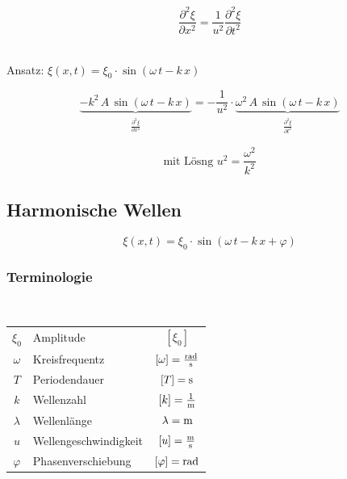 \begin{minipage}{0.38\linewidth}
$$\frac{\partial^2 \xi}{\partial x^2} = \frac{1}{u^2} \frac{\partial^2 \xi}{\partial t^2} $$ \\
\end{minipage}
\hfill
\begin{minipage}{0.58\linewidth}
Ansatz: $\xi(x,t) = \xi_0 \cdot \sin(\omega \, t - k \, x)$ \\
\end{minipage}

$$ \underbrace{- k^2 \, A \, \sin(\omega \, t - k \, x)}_{\substack{\frac{\partial^2 \xi}{\partial x^2} }} = - \frac{1}{u^2} \cdot \underbrace{ \omega^2 \, A \,\sin(\omega \, t - k \, x)}_{\substack{\frac{\partial^2 \xi}{\partial t^2} }}  $$ 


$$ \boxed{ \text{mit Lösng } u^2 = \frac{\omega^2}{k^2} } $$



\subsection{Harmonische Wellen}

$$ \boxed{ \xi(x, t) = \xi_0 \cdot \sin( \omega \, t - k \, x + \varphi) }  $$


\subsubsection{Terminologie}

 \\
\raggedright

\renewcommand{\arraystretch}{1.1}
\begin{tabular}{c l c}
$\xi_0$ & Amplitude & $[\xi_0]$ \\
$\omega$ & Kreisfrequentz & $[\omega] = \frac{\mathrm{rad}}{\mathrm{s}}$ \\
$T$ & Periodendauer & $[T] = \mathrm{s}$ \\
$k$ & Wellenzahl & $[k] = \frac{1}{\mathrm{m}}$ \\
$\lambda$ & Wellenlänge & $\lambda = \mathrm{m} $ \\
$u$ & Wellengeschwindigkeit & $[u] = \frac{\mathrm{m}}{\mathrm{s}}$ \\
$\varphi$ & Phasenverschiebung & $[\varphi] = \mathrm{rad}$ 
\end{tabular}
\renewcommand{\arraystretch}{1}



